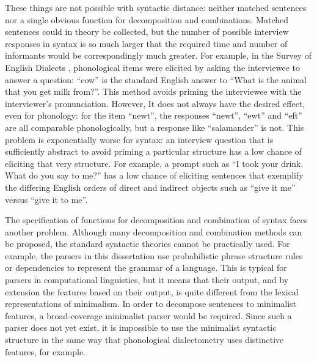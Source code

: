 These things are not possible with syntactic distance: neither matched
sentences nor a single obvious function for decomposition and
combinations. Matched sentences could in theory be collected, but the
number of possible interview responses in syntax is so much larger
that the required time and number of informants would be
correspondingly much greater. For example, in the Survey of English
Dialects \cite{orton63}, phonological items were elicited by asking
the interviewee to answer a question: ``cow'' is the standard English
answer to ``What is the animal that you get milk from?''. This method
avoids priming the interviewee with the interviewer's
pronunciation. However, It does not always have the desired effect,
even for phonology: for the item ``newt'', the responses ``newt'',
``ewt'' and ``eft'' are all comparable phonologically, but a response
like ``salamander'' is not. This problem is exponentially worse for
syntax: an interview question that is sufficiently abstract to avoid
priming a particular structure has a low chance of eliciting that very
structure. For example, a prompt such as ``I took your drink. What do
you say to me?'' has a low chance of eliciting sentences that
exemplify the differing English orders of direct and indirect objects
such as ``give it me'' versus ``give it to me''.

The specification of functions for decomposition and combination of
syntax faces another problem. Although many decomposition and
combination methods can be proposed, the standard syntactic theories
cannot be practically used. For example, the parsers in this
dissertation use probabilistic phrase structure rules or dependencies
to represent the grammar of a language. This is typical for parsers
in computational linguistics, but it means that their output, and by
extension the features based on their output, is quite different from
the lexical representations of minimalism. In order to decompose
sentences to minimalist features, a broad-coverage minimalist parser
would be required. Since such a parser does not yet exist, it is
impossible to use the minimalist syntactic structure in the same way that
phonological dialectometry uses distinctive features, for example.

